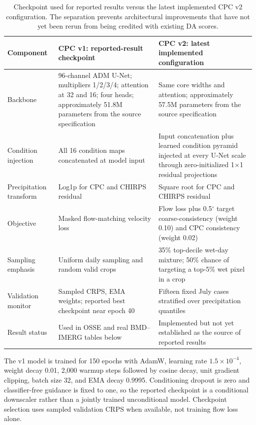 \documentclass[10pt,twocolumn]{article}
\begin{document}
\begin{table}[t]
\centering
\caption{Checkpoint used for reported results versus the latest implemented CPC v2 configuration. The separation prevents architectural improvements that have not yet been rerun from being credited with existing DA scores.}
\label{tab:architecture}
\small
\begin{tabular}{p{}p{}p{}}
\toprule
Component & CPC v1: reported-result checkpoint & CPC v2: latest implemented configuration \\
\midrule
Backbone & 96-channel ADM U-Net; multipliers 1/2/3/4; attention at 32 and 16; four heads; approximately 51.8M parameters from the source specification & Same core widths and attention; approximately 57.5M parameters from the source specification \\
Condition injection & All 16 condition maps concatenated at model input & Input concatenation plus learned condition pyramid injected at every U-Net scale through zero-initialized 1$\times$1 residual projections \\
Precipitation transform & Log1p for CPC and CHIRPS residual & Square root for CPC and CHIRPS residual \\
Objective & Masked flow-matching velocity loss & Flow loss plus 0.5$^\circ$ target coarse-consistency (weight 0.10) and CPC consistency (weight 0.02) \\
Sampling emphasis & Uniform daily sampling and random valid crops & 35\% top-decile wet-day mixture; 50\% chance of targeting a top-5\% wet pixel in a crop \\
Validation monitor & Sampled CRPS, EMA weights; reported best checkpoint near epoch 40 & Fifteen fixed July cases stratified over precipitation quantiles \\
Result status & Used in OSSE and real BMD--IMERG tables below & Implemented but not yet established as the source of reported results \\
\bottomrule
\end{tabular}
\end{table}

The v1 model is trained for 150 epochs with AdamW, learning rate $1.5\times10^{-4}$, weight decay 0.01, 2,000 warmup steps followed by cosine decay, unit gradient clipping, batch size 32, and EMA decay 0.9995. Conditioning dropout is zero and classifier-free guidance is fixed to one, so the reported checkpoint is a conditional downscaler rather than a jointly trained unconditional model. Checkpoint selection uses sampled validation CRPS when available, not training flow loss alone.
\end{document}
